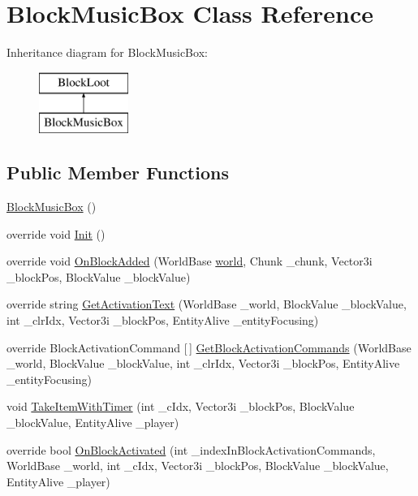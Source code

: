 \hypertarget{class_block_music_box}{}\section{Block\+Music\+Box Class Reference}
\label{class_block_music_box}
Inheritance diagram for Block\+Music\+Box\+:\begin{figure}[H]
\begin{center}
\leavevmode
\includegraphics[height=2.000000cm]{d3/dcc/class_block_music_box}
\end{center}
\end{figure}
\subsection*{Public Member Functions}
\begin{DoxyCompactItemize}
\item 
\mbox{\hyperlink{class_block_music_box_aa9e724a3213f8d198ceb0516a9c3908c}{Block\+Music\+Box}} ()
\item 
override void \mbox{\hyperlink{class_block_music_box_a918cf2f3e7bf4e142d8eed610d611604}{Init}} ()
\item 
override void \mbox{\hyperlink{class_block_music_box_a219b49bc87eaaf1273ebb4159ed37b2a}{On\+Block\+Added}} (World\+Base \mbox{\hyperlink{_sphere_i_i_01_music_01_boxes_2_config_2_localization_8txt_a7ede01351426b1b7f6c1ce5f794e474f}{world}}, Chunk \+\_\+chunk, Vector3i \+\_\+block\+Pos, Block\+Value \+\_\+block\+Value)
\item 
override string \mbox{\hyperlink{class_block_music_box_a294e5968eee60a142c725730257750e3}{Get\+Activation\+Text}} (World\+Base \+\_\+world, Block\+Value \+\_\+block\+Value, int \+\_\+clr\+Idx, Vector3i \+\_\+block\+Pos, Entity\+Alive \+\_\+entity\+Focusing)
\item 
override Block\+Activation\+Command \mbox{[}$\,$\mbox{]} \mbox{\hyperlink{class_block_music_box_a59de4b1cf03b0f6f1f601ab02aa8e064}{Get\+Block\+Activation\+Commands}} (World\+Base \+\_\+world, Block\+Value \+\_\+block\+Value, int \+\_\+clr\+Idx, Vector3i \+\_\+block\+Pos, Entity\+Alive \+\_\+entity\+Focusing)
\item 
void \mbox{\hyperlink{class_block_music_box_ad6371ea130708e5b9ca3cdc1f8ec5206}{Take\+Item\+With\+Timer}} (int \+\_\+c\+Idx, Vector3i \+\_\+block\+Pos, Block\+Value \+\_\+block\+Value, Entity\+Alive \+\_\+player)
\item 
override bool \mbox{\hyperlink{class_block_music_box_aa9c10407f1ca52c9e4b7d83645581d21}{On\+Block\+Activated}} (int \+\_\+index\+In\+Block\+Activation\+Commands, World\+Base \+\_\+world, int \+\_\+c\+Idx, Vector3i \+\_\+block\+Pos, Block\+Value \+\_\+block\+Value, Entity\+Alive \+\_\+player)
\end{DoxyCompactItemize}


